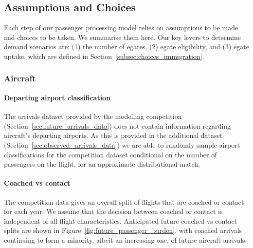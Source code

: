 \documentclass[10pt]{article}
\begin{document}
\subsection{Assumptions and Choices}
Each step of our passenger processing model relies on assumptions to be made and choices to be taken. We summarise them here. Our key levers to determine demand scenarios are: (1) the number of \glspl{egate}, (2) \gls{egate} eligibility, and (3) \gls{egate} uptake, which are defined in Section~\ref{subsec:choices_immigration}.

\subsubsection{Aircraft}

\paragraph{Departing airport classification}
The arrivals dataset provided by the modelling competition (Section~\ref{sec:future_arrivals_data}) does not contain information regarding aircraft's departing airports. As this is provided in the additional dataset (Section~\ref{sec:observed_arrivals_data}) we are able to randomly sample airport classifications for the competition dataset conditional on the number of passengers on the flight, for an approximate distributional match. 




\paragraph{Coached vs contact}
The competition data gives an overall split of flights that are coached or contact for each year. We assume that the decision between coached or contact is independent of all flight characteristics. Anticipated future coached vs contact splits are shown in Figure~\ref{fig:future_passenger_burden}, with coached arrivals continuing to form a minority, albeit an increasing one, of future aircraft arrivals.
\end{document}
